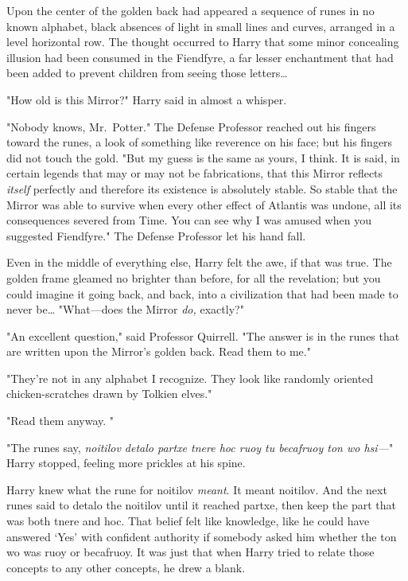 Upon the center of the golden back had appeared a sequence of runes in no known
alphabet, black absences of light in small lines and curves, arranged in a
level horizontal row. The thought occurred to Harry that some minor concealing
illusion had been consumed in the Fiendfyre, a far lesser enchantment that had
been added to prevent children from seeing those letters{\ldots}

"How old is this Mirror?" Harry said in almost a whisper.

"Nobody knows, Mr.~Potter." The Defense Professor reached out his fingers
toward the runes, a look of something like reverence on his face; but his
fingers did not touch the gold. "But my guess is the same as yours, I think. It
is said, in certain legends that may or may not be fabrications, that this
Mirror reflects \emph{itself} perfectly and therefore its existence is
absolutely stable. So stable that the Mirror was able to survive when every
other effect of Atlantis was undone, all its consequences severed from Time.
You can see why I was amused when you suggested Fiendfyre." The Defense
Professor let his hand fall.

Even in the middle of everything else, Harry felt the awe, if that was true.
The golden frame gleamed no brighter than before, for all the revelation; but
you could imagine it going back, and back, into a civilization that had been
made to never be{\ldots} "What---does the Mirror \emph{do,} exactly?"

"An excellent question," said Professor Quirrell. "The answer is in the runes
that are written upon the Mirror's golden back. Read them to me."

"They're not in any alphabet I recognize. They look like randomly oriented
chicken-scratches drawn by Tolkien elves."

"Read them anyway. "

"The runes say, \emph{noitilov detalo partxe tnere hoc ruoy tu becafruoy ton wo
hsi---}" Harry stopped, feeling more prickles at his spine.

Harry knew what the rune for noitilov \emph{meant}. It meant noitilov. And the
next runes said to detalo the noitilov until it reached partxe, then keep the
part that was both tnere and hoc. That belief felt like knowledge, like he could
have answered `Yes' with confident authority if somebody asked him
whether the ton wo was ruoy or becafruoy. It was just that when Harry tried to
relate those concepts to any other concepts, he drew a blank.

